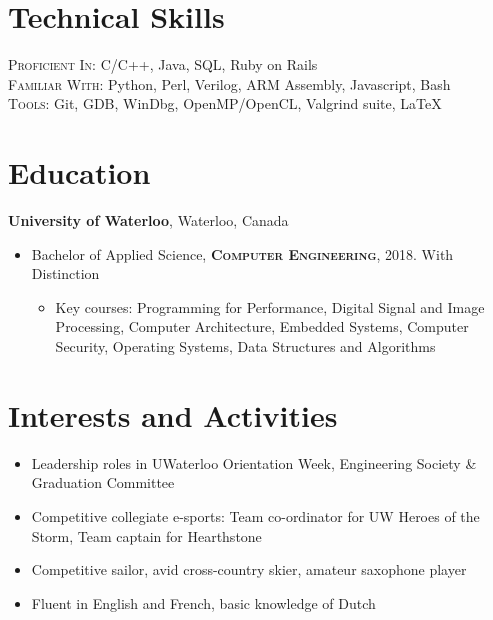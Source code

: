 \documentclass[a4paper,10pt]{article}
\begin{document}
\hfill
\begin{minipage}[t]{0.36\textwidth}

\section{Technical Skills}
\medskip

\textsc{Proficient In:} C/C++, Java, SQL, Ruby on Rails \\
\textsc{Familiar With:} Python, Perl, Verilog, ARM Assembly, Javascript, Bash \\
\textsc{Tools:} Git, GDB, WinDbg, OpenMP/OpenCL, Valgrind suite, \LaTeX \\

\section{Education}
\textbf{University of Waterloo}, Waterloo, Canada
\medskip
\begin{itemize}
    \item{Bachelor of Applied Science, \textsc{\textbf{Computer Engineering}}, 2018. With Distinction}
    \begin{itemize}
        \item {\footnotesize{Key courses: Programming for Performance, Digital Signal and Image Processing, Computer Architecture, Embedded Systems, Computer Security, Operating Systems, Data Structures and Algorithms}}
    \end{itemize}
\end{itemize}

\medskip

\section{Interests and Activities}
\medskip
\begin{itemize}
	\item {Leadership roles in UWaterloo Orientation Week, Engineering Society \& Graduation Committee}
	\item {Competitive collegiate e-sports: Team co-ordinator for UW Heroes of the Storm, Team captain for Hearthstone}
	\item {Competitive sailor, avid cross-country skier, amateur saxophone player}
    \item {Fluent in English and French, basic knowledge of Dutch}
\end{itemize}


\end{minipage}
\end{document}
